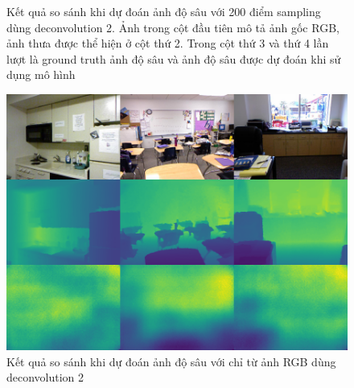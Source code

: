 \begin{enumerate}
\begin{center}
\begin{figure}[H]
\begin{center}
   \end{center}
   \caption[Kết quả so sánh khi dự đoán ảnh độ sâu với 200 điểm sampling dùng deconvolution 2]{Kết quả so sánh khi dự đoán ảnh độ sâu với 200 điểm sampling dùng deconvolution 2. Ảnh trong cột đầu tiên mô tả ảnh gốc RGB, ảnh thưa được thể hiện ở cột thứ 2. Trong cột thứ 3 và thứ 4 lần lượt là ground truth ảnh độ sâu và ảnh độ sâu được dự đoán khi sử dụng mô hình}
   \label{fig:deconv2_s200}
   \end{figure}
 \end{center}
 
 
 \begin{center}
   \begin{figure}[H]
   \begin{center}
   \includegraphics[scale=0.5]{image/0sample}
   \end{center}
   \caption[abcdef]{Kết quả so sánh khi dự đoán ảnh độ sâu với chỉ từ ảnh RGB dùng deconvolution 2}
   \label{fig:deconv2_0s}
   \end{figure}
 \end{center}


\end{enumerate}
